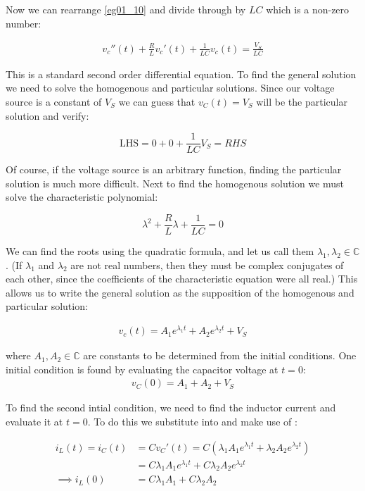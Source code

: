 \documentclass[14pt,a5paper,twoside]{book}
\begin{document}
Now we can rearrange \eqref{eg01_10} and divide through by $LC$ which is a non-zero number:

\begin{align}
v_c''(t) + \frac{R}{L}v_c'(t) + \frac{1}{LC}v_c(t) = \frac{V_S}{LC} \label{eg01_11}
\end{align}

This is a standard second order differential equation. To find the general solution we need to solve the homogenous and particular solutions. Since our voltage source is a constant of $V_S$ we can guess that $v_C(t) = V_S$ will be the particular solution and verify:

$$ \mathrm{LHS} = 0 +  0  + \frac{1}{LC}V_S = RHS $$

Of course, if the voltage source is an arbitrary function, finding the particular solution is much more difficult. Next to find the homogenous solution we must solve the characteristic polynomial:

$$
\lambda^2 + \frac{R}{L}\lambda + \frac{1}{LC} = 0
$$

We can find the roots using the quadratic formula, and let us call them $\lambda_1, \lambda_2 \in \mathbb{C}$. (If $\lambda_1$ and $\lambda_2$ are not real numbers, then they must be complex conjugates of each other, since the coefficients of the characteristic equation were all real.) This allows us to write the general solution as the supposition of the homogenous and particular solution:

\begin{align}
v_c(t) = A_1 e^{\lambda_1 t} + A_2 e^{\lambda_2 t} + V_S \label{eg01_12}
\end{align}

where $A_1, A_2 \in\mathbb{C}$ are constants to be determined from the initial conditions. One initial condition is found by evaluating the capacitor voltage at $t=0$: 
\begin{align}
v_C(0) = A_1 + A_2 + V_S\label{eg01_13}
\end{align}

To find the second intial condition, we need to find the inductor current and evaluate it at $t=0$. To do this we substitute \label{eg01_12} into \label{eg01_3} and make use of \label{eg01_6}:

\begin{align}
i_L(t) = i_C(t) &= Cv_C'(t) = C\left(\lambda_1 A_1e^{\lambda_1t} + \lambda_2 A_2e^{\lambda_2t}\right) \nonumber\\
&= C\lambda_1 A_1e^{\lambda_1t} + C\lambda_2 A_2e^{\lambda_2t} \nonumber \\
\implies i_L(0) &= C\lambda_1 A_1 + C\lambda_2 A_2 \label{eg01_13}
\end{align}
\end{document}
